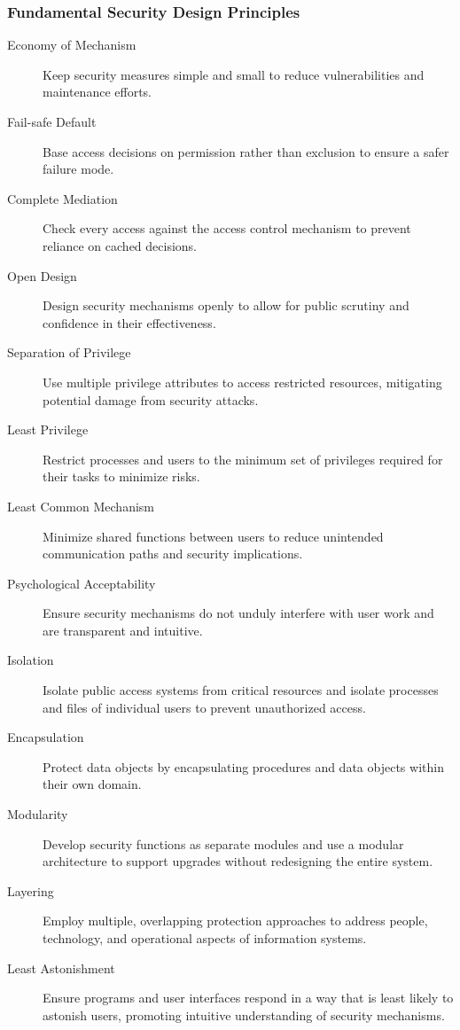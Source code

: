 \documentclass{article}
\begin{document}
            \subsubsection{Fundamental Security Design Principles} 
            \begin{description}
                \item[Economy of Mechanism] Keep security measures simple and small to reduce vulnerabilities and maintenance efforts.
                \item[Fail-safe Default] Base access decisions on permission rather than exclusion to ensure a safer failure mode.
                \item[Complete Mediation] Check every access against the access control mechanism to prevent reliance on cached decisions.
                \item[Open Design] Design security mechanisms openly to allow for public scrutiny and confidence in their effectiveness.
                \item[Separation of Privilege] Use multiple privilege attributes to access restricted resources, mitigating potential damage from security attacks.
                \item[Least Privilege] Restrict processes and users to the minimum set of privileges required for their tasks to minimize risks.
                \item[Least Common Mechanism] Minimize shared functions between users to reduce unintended communication paths and security implications.
                \item[Psychological Acceptability] Ensure security mechanisms do not unduly interfere with user work and are transparent and intuitive.
                \item[Isolation] Isolate public access systems from critical resources and isolate processes and files of individual users to prevent unauthorized access.
                \item[Encapsulation] Protect data objects by encapsulating procedures and data objects within their own domain.
                \item[Modularity] Develop security functions as separate modules and use a modular architecture to support upgrades without redesigning the entire system.
                \item[Layering] Employ multiple, overlapping protection approaches to address people, technology, and operational aspects of information systems.
                \item[Least Astonishment] Ensure programs and user interfaces respond in a way that is least likely to astonish users, promoting intuitive understanding of security mechanisms.
            \end{description}
\end{document}
